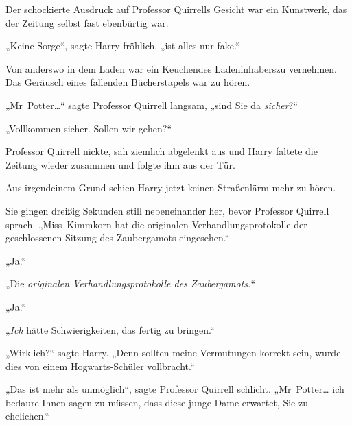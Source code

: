 Der schockierte Ausdruck auf Professor Quirrells Gesicht war ein Kunstwerk, das der Zeitung selbst fast ebenbürtig war.

„Keine Sorge“, sagte Harry fröhlich, „ist alles nur fake.“

Von anderswo in dem Laden war ein Keuchendes Ladeninhaberszu vernehmen. Das Geräusch eines fallenden Bücherstapels war zu hören.

„Mr~Potter…“ sagte Professor Quirrell langsam, „sind Sie da \emph{sicher}?“

„Vollkommen sicher. Sollen wir gehen?“

Professor Quirrell nickte, sah ziemlich abgelenkt aus und Harry faltete die Zeitung wieder zusammen und folgte ihm aus der Tür.

Aus irgendeinem Grund schien Harry jetzt keinen Straßenlärm mehr zu hören.

Sie gingen dreißig Sekunden still nebeneinander her, bevor Professor Quirrell sprach. „Miss~Kimmkorn hat die originalen Verhandlungsprotokolle der geschlossenen Sitzung des Zaubergamots eingesehen.“

„Ja.“

„Die \emph{originalen Verhandlungsprotokolle des Zaubergamots.}“

„Ja.“

„\emph{Ich} hätte Schwierigkeiten, das fertig zu bringen.“

„Wirklich?“ sagte Harry. „Denn sollten meine Vermutungen korrekt sein, wurde dies von einem Hogwarts-Schüler vollbracht.“

„Das ist mehr als unmöglich“, sagte Professor Quirrell schlicht. „Mr~Potter… ich bedaure Ihnen sagen zu müssen, dass diese junge Dame erwartet, Sie zu ehelichen.“

